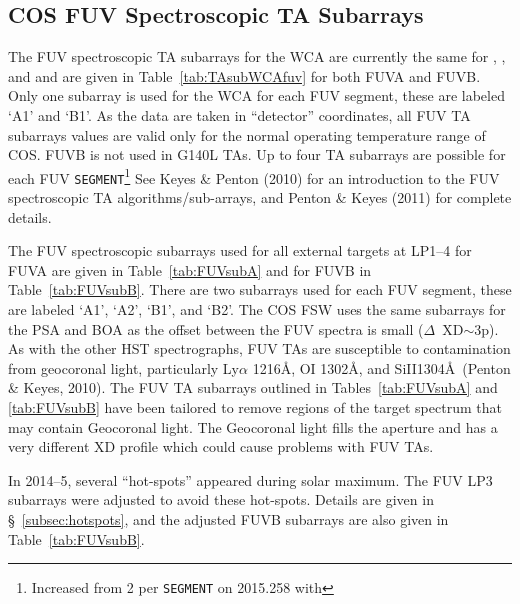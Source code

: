 \subsection{COS FUV Spectroscopic TA Subarrays}\label{subsec:FUVspSUBS}
The FUV spectroscopic TA subarrays for the WCA are currently the same for ,  , and 
and are given in Table~\ref{tab:TAsubWCAfuv} for both FUVA and FUVB.
Only one subarray is used for the WCA for each FUV segment, these are labeled `A1' and `B1'.
As the data are taken in ``detector'' coordinates, all FUV TA subarrays values are valid only for the normal operating temperature range of COS.
FUVB is not used in G140L TAs. Up to four TA subarrays are possible for each FUV \texttt{SEGMENT}\footnote{Increased from 2 per \texttt{SEGMENT} on 2015.258 with }
See Keyes \& Penton (2010) for an introduction to the FUV spectroscopic TA algorithms/sub-arrays, and Penton \& Keyes (2011) for complete details.

The FUV spectroscopic subarrays used for all external targets at LP1--4 for FUVA are given in Table~\ref{tab:FUVsubA} and for FUVB in Table~\ref{tab:FUVsubB}.
There are two subarrays used for each FUV segment, these are labeled `A1', `A2', `B1', and `B2'.
The COS FSW uses the same subarrays for the PSA and BOA as the offset between the FUV spectra is small ($\Delta$~XD$\sim$3p).
As with the other HST spectrographs, FUV TAs are susceptible to contamination from geocoronal light, particularly Ly$\alpha$ 1216\AA, {\rm O}\textsc{I} 1302\AA, and {\rm Si}{\sc II}1304\AA\ (Penton \& Keyes, 2010).
The FUV TA subarrays outlined in Tables~\ref{tab:FUVsubA} and \ref{tab:FUVsubB} have been tailored to remove regions
of the target spectrum that may contain Geocoronal light. The Geocoronal light fills the aperture and has a very different XD profile which could cause problems with FUV TAs.

In 2014--5, several ``hot-spots'' appeared during solar maximum. The FUV LP3 subarrays were adjusted to avoid these hot-spots.
Details are given in \S~\ref{subsec:hotspots}, and the adjusted FUVB subarrays are also given in Table~\ref{tab:FUVsubB}.


